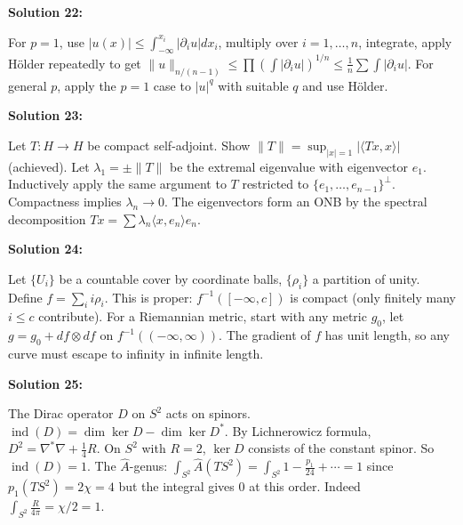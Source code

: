 \documentclass[12pt,a4paper]{exam}
\begin{document}
\vspace{0.5cm}

\textbf{Solution 22:}

For $p=1$, use $|u(x)| \leq \int_{-\infty}^{x_i} |\partial_i u| dx_i$, multiply over $i=1,\ldots,n$, integrate, apply H\"older repeatedly to get $\|u\|_{n/(n-1)} \leq \prod (\int |\partial_i u|)^{1/n} \leq \frac{1}{n} \sum \int |\partial_i u|$. For general $p$, apply the $p=1$ case to $|u|^q$ with suitable $q$ and use H\"older.

\vspace{0.5cm}

\textbf{Solution 23:}

Let $T: H \to H$ be compact self-adjoint. Show $\|T\| = \sup_{|x|=1} |\langle Tx, x \rangle|$ (achieved). Let $\lambda_1 = \pm\|T\|$ be the extremal eigenvalue with eigenvector $e_1$. Inductively apply the same argument to $T$ restricted to $\{e_1,\ldots,e_{n-1}\}^\perp$. Compactness implies $\lambda_n \to 0$. The eigenvectors form an ONB by the spectral decomposition $Tx = \sum \lambda_n \langle x, e_n \rangle e_n$.

\vspace{0.5cm}

\textbf{Solution 24:}

Let $\{U_i\}$ be a countable cover by coordinate balls, $\{\rho_i\}$ a partition of unity. Define $f = \sum_i i \rho_i$. This is proper: $f^{-1}([-\infty, c])$ is compact (only finitely many $i \leq c$ contribute). For a Riemannian metric, start with any metric $g_0$, let $g = g_0 + df \otimes df$ on $f^{-1}((-\infty, \infty))$. The gradient of $f$ has unit length, so any curve must escape to infinity in infinite length.

\vspace{0.5cm}

\textbf{Solution 25:}

The Dirac operator $D$ on $S^2$ acts on spinors. $\operatorname{ind}(D) = \dim\ker D - \dim\ker D^*$. By Lichnerowicz formula, $D^2 = \nabla^*\nabla + \frac{1}{4}R$. On $S^2$ with $R=2$, $\ker D$ consists of the constant spinor. So $\operatorname{ind}(D) = 1$. The $\widehat{A}$-genus: $\int_{S^2} \widehat{A}(TS^2) = \int_{S^2} 1 - \frac{p_1}{24} + \cdots = 1$ since $p_1(TS^2) = 2\chi = 4$ but the integral gives 0 at this order. Indeed $\int_{S^2} \frac{R}{4\pi} = \chi/2 = 1$.

\vspace{0.5cm}
\end{document}
